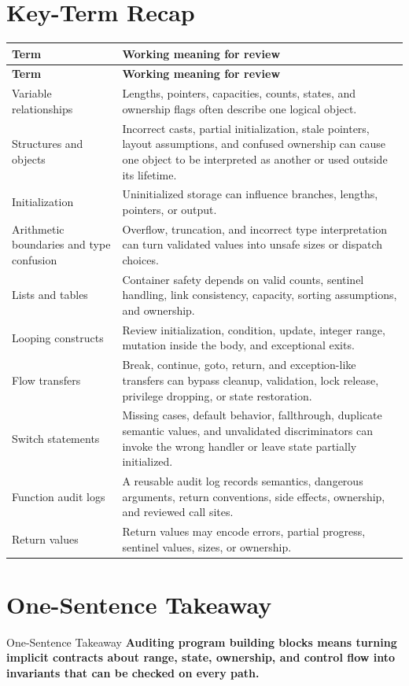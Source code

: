 \documentclass[11pt,letterpaper]{article}
\begin{document}
\section{Key-Term Recap}
\begin{longtable}{>{\raggedright\arraybackslash}p{}p{}}
\toprule
\textbf{Term} & \textbf{Working meaning for review} \\
\midrule
\endfirsthead
\toprule
\textbf{Term} & \textbf{Working meaning for review} \\
\midrule
\endhead
Variable relationships & Lengths, pointers, capacities, counts, states, and ownership flags often describe one logical object. \\
Structures and objects & Incorrect casts, partial initialization, stale pointers, layout assumptions, and confused ownership can cause one object to be interpreted as another or used outside its lifetime. \\
Initialization & Uninitialized storage can influence branches, lengths, pointers, or output. \\
Arithmetic boundaries and type confusion & Overflow, truncation, and incorrect type interpretation can turn validated values into unsafe sizes or dispatch choices. \\
Lists and tables & Container safety depends on valid counts, sentinel handling, link consistency, capacity, sorting assumptions, and ownership. \\
Looping constructs & Review initialization, condition, update, integer range, mutation inside the body, and exceptional exits. \\
Flow transfers & Break, continue, goto, return, and exception-like transfers can bypass cleanup, validation, lock release, privilege dropping, or state restoration. \\
Switch statements & Missing cases, default behavior, fallthrough, duplicate semantic values, and unvalidated discriminators can invoke the wrong handler or leave state partially initialized. \\
Function audit logs & A reusable audit log records semantics, dangerous arguments, return conventions, side effects, ownership, and reviewed call sites. \\
Return values & Return values may encode errors, partial progress, sentinel values, sizes, or ownership. \\
\bottomrule
\end{longtable}
\section{One-Sentence Takeaway}
\begin{CornellExamBox}{One-Sentence Takeaway}
\textbf{Auditing program building blocks means turning implicit contracts about range, state, ownership, and control flow into invariants that can be checked on every path.}
\end{CornellExamBox}
\end{document}
